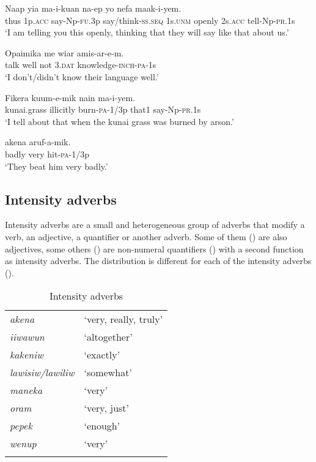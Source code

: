 \ea%
\label{ex:3:x704}
\gll Naap yia ma-i-kuan na-ep yo  nefa maak-i-yem.\\
thus 1p.\textsc{acc} say-Np-\textsc{fu}.3p say/think-\textsc{ss}.\textsc{seq} 1s.\textsc{unm} openly 2s.\textsc{acc} tell-Np-\textsc{pr}.1s\\
\glt`I am telling you this openly, thinking that they will say like that about us.'
\z

\ea%
\label{ex:3:x505}
\gll Opaimika  me wiar amis-ar-e-m. \\
talk well not 3.\textsc{dat} knowledge-\textsc{inch}-\textsc{pa}-1s\\
\glt`I don't/didn't know their language well.'
\z

\ea%
\label{ex:3:x507}
\gll Fikera  kuum-e-mik nain ma-i-yem. \\
kunai.grass illicitly burn-\textsc{pa}-1/3p that1 say-Np-\textsc{pr}.1s\\
\glt`I tell about that when the kunai grass was burned by arson.'
\z

\ea%
\label{ex:3:x506}
\gll {} akena aruf-a-mik. \\
badly very hit-\textsc{pa}-1/3p\\
\glt`They beat him very badly.'
\z

\subsection{Intensity adverbs}\label{sec:3.9.2}
{}
Intensity adverbs are a small and heterogeneous group of adverbs that modify a verb, an adjective, a quantifier or another adverb. Some of them () are also adjectives, some others () are non-numeral quantifiers () with a second function as intensity adverbs. The distribution is different for each of the intensity adverbs ().

\begin{table}
\begin{tabular}{>{\itshape}ll}
\mytoprule
akena &`very, really, truly'\\
iiwawun &`altogether'\\
kakeniw &`exactly'\\
lawisiw/lawiliw &`somewhat'\\
maneka &`very'\\
oram &`very, just'\\
pepek &`enough'\\
wenup &`very'\\
\mybottomrule 
\end{tabular}
\caption{Intensity adverbs}
\label{tab:3:intensityadverbs}
\end{table}


